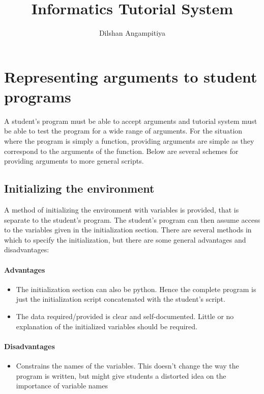 
\title{Informatics Tutorial System}
\author{Dilshan Angampitiya}	


\maketitle
\tableofcontents

\section{Representing arguments to student programs}
A student's program must be able to accept arguments and tutorial system must be able to test the program for a wide range of arguments. For the situation where the program is simply a function, providing arguments are simple as they correspond to the arguments of the function. Below are several schemes for providing arguments to more general scripts.

\subsection{Initializing the environment}
A method of initializing the environment with variables is provided, that is separate to the student's program. The student's program can then assume access to the variables given in the initialization section. There are several methods in which to specify the initialization, but there are some general advantages and disadvantages:

\paragraph{Advantages}
\begin{itemize}
\item The initialization section can also be python. Hence the complete program is just the initialization script concatenated with the student's script. 
\item The data required/provided is clear and self-documented. Little or no explanation of the initialized variables should be required.
\end{itemize}

\paragraph{Disadvantages}
\begin{itemize}
\item Constrains the names of the variables. This doesn't change the way the program is written, but might give students a distorted idea on the importance of variable names
\end{itemize}

